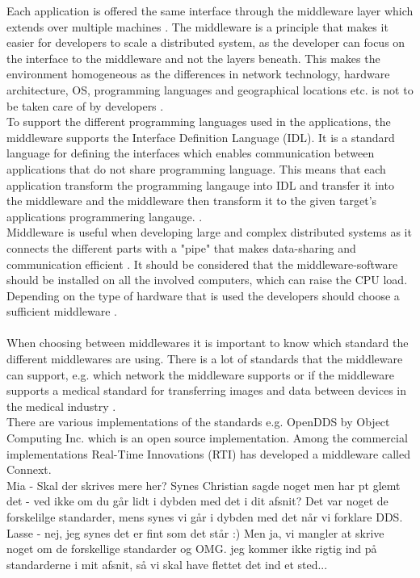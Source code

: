 \documentclass[Main]{subfiles}
\begin{document}
Each application is offered the same interface through the middleware layer which extends over multiple machines \cite[p. 3]{Tanenbaum}. The middleware is a principle that makes it easier for developers to scale a distributed system, as the developer can focus on the interface to the middleware and not the layers beneath. This makes the environment homogeneous as the differences in network technology, hardware architecture, OS, programming languages and geographical locations etc. is not to be taken care of by developers \cite{DDS-slides} \cite[p. 68]{Coulouris}.
\\
To support the different programming languages used in the applications, the middleware supports the Interface Definition Language (IDL). It is a standard language for defining the interfaces which enables communication between applications that do not share programming language. This means that each application transform the programming langauge into IDL and transfer it into the middleware and the middleware then transform it to the given target's applications programmering langauge. \cite{DDS-slides} \cite{RTI} \cite{wiki-idl}.
\\
Middleware is useful when developing large and complex distributed systems as it connects the different parts with a "pipe" that makes data-sharing and communication efficient \cite{DDS-slides} \cite[p. 68]{Coulouris}. It should be considered that the middleware-software should be installed on all the involved computers, which can raise the CPU load. Depending on the type of hardware that is used the developers should choose a sufficient middleware \cite{DDS-slides}.
\\
\\
When choosing between middlewares it is important to know which standard the different middlewares are using. There is a lot of standards that the middleware can support, e.g. which network the middleware supports or if the middleware supports a medical standard for transferring images and data between devices in the medical industry \cite{DDS_slides}.\\
There are various implementations of the standards e.g. OpenDDS by Object Computing Inc. which is an open source implementation. Among the commercial implementations Real-Time Innovations (RTI) has developed a middleware called Connext.\\

Mia - Skal der skrives mere her? Synes Christian sagde noget men har pt glemt det - ved ikke om du går lidt i dybden med det i dit afsnit? Det var noget de forskelilge standarder, mens synes vi går i dybden med det når vi forklare DDS.
Lasse - nej, jeg synes det er fint som det står :) Men ja, vi mangler at skrive noget om de forskellige standarder og OMG. jeg kommer ikke rigtig ind på standarderne i mit afsnit, så vi skal have flettet det ind et sted... 
\end{document}
